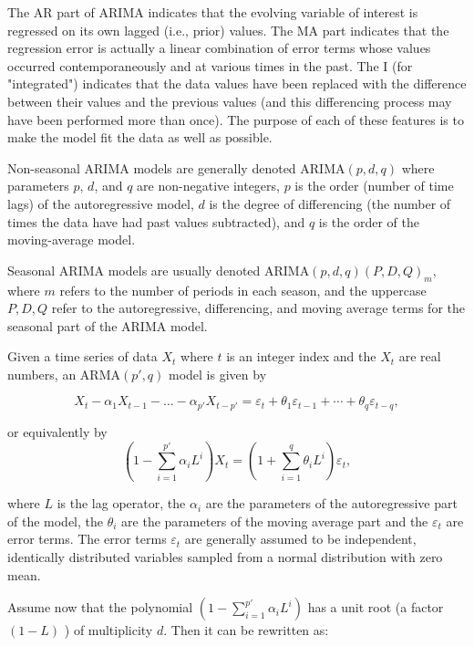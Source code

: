 \documentclass{mcmthesis}
\begin{document}
The AR part of ARIMA indicates that the evolving variable of interest is regressed on its own lagged (i.e., prior) values. The MA part indicates that the regression error is actually a linear combination of error terms whose values occurred contemporaneously and at various times in the past. The I (for "integrated") indicates that the data values have been replaced with the difference between their values and the previous values (and this differencing process may have been performed more than once). The purpose of each of these features is to make the model fit the data as well as possible.

Non-seasonal ARIMA models are generally denoted ARIMA$(p,d,q)$ where parameters $p$, $d$, and $q$ are non-negative integers, $p$ is the order (number of time lags) of the autoregressive model, $d$ is the degree of differencing (the number of times the data have had past values subtracted), and $q$ is the order of the moving-average model. 

Seasonal ARIMA models are usually denoted ARIMA$(p,d,q)(P,D,Q)_m$, 
where $m$ refers to the number of periods in each season, and the uppercase $P,D,Q$ refer to the autoregressive, differencing, and moving average terms for the seasonal part of the ARIMA model\cite{Hyndman2015Forecasting, ARIMA}.

Given a time series of data $X_t$ where $t$ is an integer index and the $X_t$ are real numbers, an ARMA$(p',q)$ model is given by

\begin{equation}\label{1}
X_{t}-\alpha _{1}X_{t-1}-\dots -\alpha _{p'}X_{t-p'}=\varepsilon _{t}+\theta _{1}\varepsilon _{t-1}+\cdots +\theta _{q}\varepsilon _{t-q},
\end{equation}

or equivalently by
\begin{equation}\label{2}
{\left(1-\sum _{i=1}^{p'}\alpha _{i}L^{i}\right)X_{t}=\left(1+\sum _{i=1}^{q}\theta _{i}L^{i}\right)\varepsilon _{t},} 
\end{equation}

where $L$ is the lag operator, the $\alpha _{i}$ are the parameters of the autoregressive part of the model, the $\theta _{i}$  are the parameters of the moving average part and the $\varepsilon _{t}$ are error terms. The error terms $\varepsilon _{t}$ are generally assumed to be independent, identically distributed variables sampled from a normal distribution with zero mean.

Assume now that the polynomial $ \textstyle \left(1-\sum _{i=1}^{p'}\alpha _{i}L^{i}\right)$ has a unit root (a factor $(1-L)$ ) of multiplicity $d$. Then it can be rewritten as:
\end{document}
